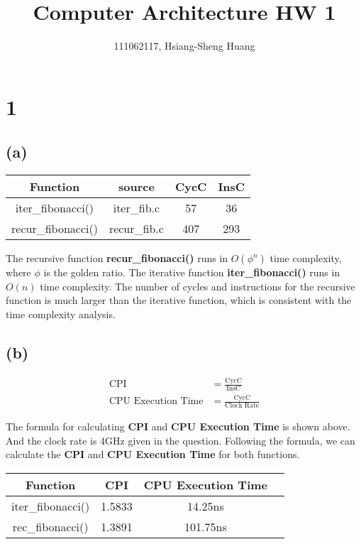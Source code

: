 \documentclass[12pt]{article}
\title{Computer Architecture HW 1}
\author{111062117, Hsiang-Sheng Huang}
\begin{document}
\maketitle

\section*{1}

\subsection*{(a)}

\begin{center}
    \begin{tabular}{|c|c|c|c|}
    \hline
    \textbf{Function} & \textbf{source} & \textbf{CycC} & \textbf{InsC} \\
    \hline
    iter\_fibonacci() & iter\_fib.c & 57   & 36 \\
    \hline
    recur\_fibonacci()  & recur\_fib.c& 407  & 293 \\
    \hline
    \end{tabular}
\end{center}

The recursive function \textbf{recur\_fibonacci()} runs in $O(\phi^n)$ time complexity, where $\phi$ is the golden ratio. The iterative function \textbf{iter\_fibonacci()} runs in $O(n)$ time complexity. The number of cycles and instructions for the recursive function is much larger than the iterative function, which is consistent with the time complexity analysis.

\subsection*{(b)}

\begin{align*}
    \text{CPI} &= \frac{\text{CycC}}{\text{InsC}} \\
    \text{CPU Execution Time} &= \frac{\text{CycC}}{\text{Clock Rate}}
\end{align*}

The formula for calculating \textbf{CPI} and \textbf{CPU Execution Time} is shown above. And the clock rate is 4GHz given in the question. Following the formula, we can calculate the \textbf{CPI} and \textbf{CPU Execution Time} for both functions.

\begin{center}
    \begin{tabular}{|c|c|c|c|}
    \hline
    \textbf{Function} & \textbf{CPI} & \textbf{CPU Execution Time}\\
    \hline
    iter\_fibonacci() & 1.5833 & 14.25ns \\
    \hline
    rec\_fibonacci()  & 1.3891 & 101.75ns \\
    \hline
    \end{tabular}
\end{center}
\end{document}
